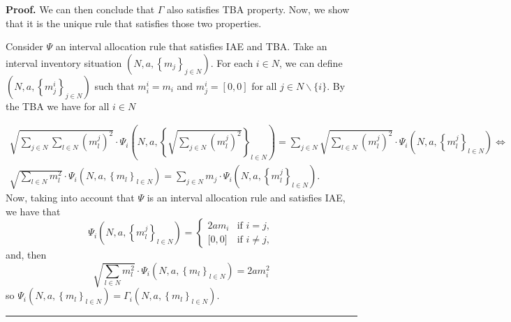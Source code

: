 \documentclass[10pt,a4paper]{amsart}
\newenvironment{proof}[1][Proof]{\noindent\textbf{#1.} }{\ \rule{0.5em}{0.5em}}
\begin{document}
\begin{proof}
We can then conclude that $\Gamma$ also satisfies TBA property. Now, we show that it is the unique rule that satisfies those two properties. 

Consider $\Psi $ an interval allocation rule that satisfies IAE and TBA. Take an interval inventory situation $(N,a,\left\{ m_{j}\right\} _{j\in
N})$. For each $i\in N$, we can define $(N,a,\left\{ m^i_j\right\} _{j\in
N})$ such that $m^i_i=m_i$ and $m^i_j=\left[0,0\right]$ for all $j\in N\backslash\{i\}$. By the TBA we have for all $i\in N$ 

\begin{equation*}
\begin{split}
    \sqrt{\sum_{j\in N}\sum_{l\in N}(m^j_l)^2}\cdot \Psi_i \left(N,a,\left\{ \sqrt{\sum_{j\in N}(m^j_l)^2}\right\} _{l\in
N}\right)=
\sum_{j\in N}\sqrt{\sum_{l\in N}(m^j_l)^2}\cdot\Psi_i \left(N,a,\left\{ m^j_l\right\} _{l\in
N}\right)\Leftrightarrow\\
\sqrt{\sum_{l\in N}m_l^2}\cdot \Psi_i \left(N,a,\left\{ m_l\right\} _{l\in
N}\right)=\sum_{j\in N}m_j\cdot\Psi_i \left(N,a,\left\{ m^j_l\right\} _{l\in
N}\right).
\end{split}
\end{equation*}
\noindent Now, taking into account that $\Psi $ is  an interval allocation rule and satisfies IAE, we have that 
\begin{equation*}
\Psi_i \left(N,a,\left\{ m^j_l\right\} _{l\in
N}\right)=%
\begin{cases}
2am_i & \text{if }i=j, \\ 
\lbrack 0,0] & \text{if }i\neq j,%
\end{cases}%
\end{equation*}%
and, then 
\begin{equation*}
\sqrt{\sum_{l\in N}m_l^2}\cdot \Psi_i \left(N,a,\left\{ m_l\right\} _{l\in
N}\right)=2am_i^2
\end{equation*}%
so $\Psi _{i}\left(N,a,\left\{ m_l\right\} _{l\in
N}\right)=\Gamma _{i}\left(N,a,\left\{ m_l\right\} _{l\in
N}\right)$. 
\end{proof}
\end{document}
